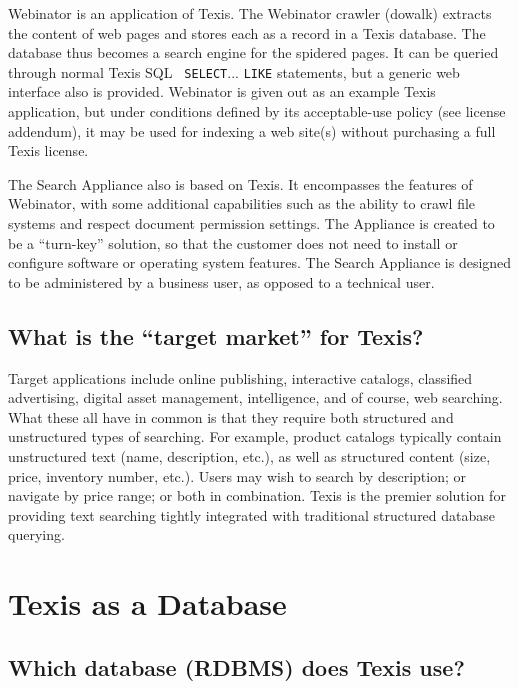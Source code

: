 Webinator is an application of Texis. The Webinator crawler (dowalk)
extracts the content of web pages and stores each as a record in a
Texis database.  The database thus becomes a search engine for the
spidered pages.  It can be queried through normal Texis SQL {\tt
  SELECT}... {\tt LIKE} statements, but a generic web interface also
is provided.  Webinator is given out as an example Texis application,
but under conditions defined by its acceptable-use policy (see license
addendum), it may be used for indexing a web site(s) without
purchasing a full Texis license.

The Search Appliance also is based on Texis.  It encompasses the
features of Webinator, with some additional capabilities such as the
ability to crawl file systems and respect document permission
settings.  The Appliance is created to be a ``turn-key'' solution, so
that the customer does not need to install or configure software or
operating system features.  The Search Appliance is designed to be
administered by a business user, as opposed to a technical user.


\section{What is the ``target market'' for Texis? }

Target applications include online publishing, interactive catalogs,
classified advertising, digital asset management, intelligence, and of
course, web searching.  What these all have in common is that they
require both structured and unstructured types of searching.  For
example, product catalogs typically contain unstructured text (name,
description, etc.), as well as structured content (size, price,
inventory number, etc.).  Users may wish to search by description; or
navigate by price range; or both in combination.  Texis is the premier
solution for providing text searching tightly integrated with
traditional structured database querying.

\chapter{Texis as a Database }

\section{Which database (RDBMS) does Texis use? }

